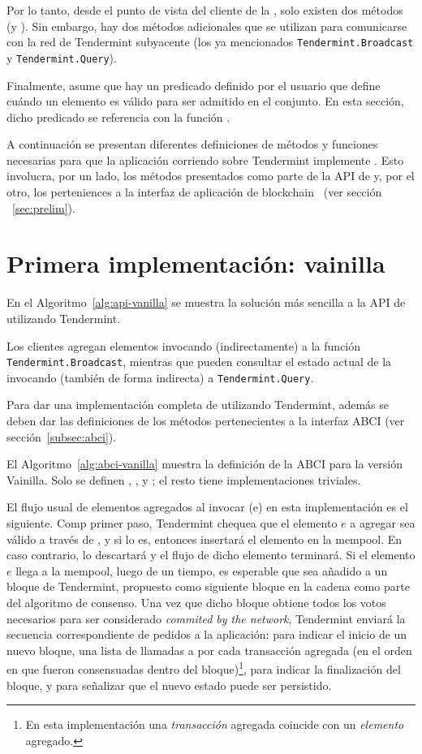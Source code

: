 Por lo tanto, desde el punto de vista del cliente de la \setchain, solo existen dos
métodos (\Add y \Get).
%
Sin embargo, hay dos métodos adicionales que se utilizan para comunicarse con la
red de Tendermint subyacente (los ya mencionados \texttt{Tendermint.Broadcast} y
\texttt{Tendermint.Query}).
%

Finalmente, \setchain asume que hay un predicado definido por el usuario que define
cuándo un elemento es válido para ser admitido en el conjunto.
%
En esta sección, dicho predicado se referencia con la función \isValidElement.

%
A continuación se presentan diferentes definiciones de métodos y funciones
necesarias para que la aplicación corriendo sobre Tendermint implemente \setchain.
Esto involucra, por un lado, los métodos presentados como parte de la API de
\setchain y, por el otro, los perteniences a la interfaz de aplicación de
blockchain ~(ver sección ~\ref{sec:prelim}).

\section{Primera implementación: vainilla}\label{sec:vanilla}


%
En el Algoritmo~\ref{alg:api-vanilla} se muestra la solución más sencilla a la API
de \setchain utilizando Tendermint.
%

Los clientes agregan elementos invocando (indirectamente) a la función
\texttt{Tendermint.Broadcast}, mientras que pueden consultar el estado actual de
la \setchain invocando (también de forma indirecta) a \texttt{Tendermint.Query}.
%

Para dar una implementación completa de \setchain utilizando Tendermint, además se
deben dar las definiciones de los métodos pertenecientes a la interfaz ABCI
(ver sección~\ref{subsec:abci}). 
%

El Algoritmo~\ref{alg:abci-vanilla} muestra la definición de la ABCI para la versión
Vainilla.
%
Solo se definen \CheckTx, \DeliverTx, y \EndBlock; el resto tiene implementaciones
triviales.

%
El flujo usual de elementos agregados al invocar \Add(e) en esta implementación es el siguiente.
%
Comp primer paso, Tendermint chequea que el elemento $e$ a agregar sea válido a través de
\CheckTx, y si lo es, entonces insertará el elemento en la mempool. En caso contrario,
lo descartará y el flujo de dicho elemento terminará.
%
Si el elemento $e$ llega a la mempool, luego de un tiempo, es esperable que sea añadido a un
bloque de Tendermint, propuesto como siguiente bloque en la cadena como parte del algoritmo de
consenso. Una vez que dicho bloque obtiene todos los votos necesarios para ser considerado
\textit{commited by the network}, Tendermint enviará
la secuencia correspondiente de pedidos a la aplicación: \BeginBlock para indicar el inicio de
un nuevo bloque,
una lista de llamadas a \DeliverTx por cada transacción agregada (en el orden en que fueron
consensuadas dentro del bloque)\footnote{En esta implementación
una \textit{transacción} agregada coincide con un \textit{elemento} agregado.},
\EndBlock para indicar la finalización del bloque, y \Commit para señalizar que el nuevo estado
puede ser persistido.

